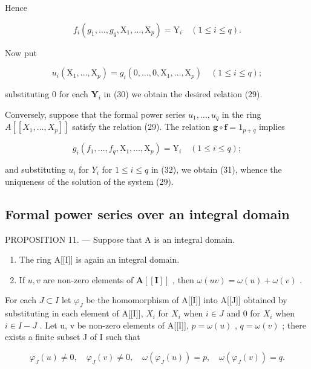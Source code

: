 Hence

\[
f _ {i} \left(g _ {1}, \dots , g _ {q}, \mathrm{X} _ {1}, \dots , \mathrm{X} _ {p}\right) = \mathrm{Y} _ {i} \quad (1 \leqslant i \leqslant q).\tag{30}
\]

Now put

\[
u _ {i} \left(\mathrm{X} _ {1}, \dots , \mathrm{X} _ {p}\right) = g _ {i} (0, \dots , 0, \mathrm{X} _ {1}, \dots , \mathrm{X} _ {p}) \quad (1 \leqslant i \leqslant q);\tag{31}
\]

substituting 0 for each \(\mathbf{Y}_i\) in (30) we obtain the desired relation (29).

Conversely, suppose that the formal power series \(u_1, \ldots, u_q\) in the ring \(A[[X_1, \ldots, X_p]]\) satisfy the relation (29). The relation \(\mathbf{g} \circ \mathbf{f} = 1_{p + q}\) implies

\[
g _ {i} (f _ {1}, \dots , f _ {q}, \mathrm{X} _ {1}, \dots , \mathrm{X} _ {p}) = \mathrm{Y} _ {i} \quad (1 \leqslant i \leqslant q);\tag{32}
\]

and substituting \(u_{i}\) for \(Y_{i}\) for \(1 \leqslant i \leqslant q\) in (32), we obtain (31), whence the uniqueness of the solution of the system (29).

\subsection{Formal power series over an integral domain}

PROPOSITION 11. --- Suppose that A is an integral domain.

\begin{enumerate}
\def\labelenumi{(\roman{enumi})}
\item
  The ring A{[}{[}I{]}{]} is again an integral domain.
\item
  If \(u, v\) are non-zero elements of \(\mathbf{A}[[\mathbf{I}]]\) , then \(\omega(uv) = \omega(u) + \omega(v)\) .
\end{enumerate}

For each \(J \subset I\) let \(\varphi_{J}\) be the homomorphism of A{[}{[}I{]}{]} into A{[}{[}J{]}{]} obtained by substituting in each element of A{[}{[}I{]}{]}, \(X_{i}\) for \(X_{i}\) when \(i \in J\) and 0 for \(X_{i}\) when \(i \in I - J\) . Let u, v be non-zero elements of A{[}{[}I{]}{]}, \(p = \omega(u)\) , \(q = \omega(v)\) ; there exists a finite subset J of I such that

\[
\varphi_ {J} (u) \neq 0, \quad \varphi_ {J} (v) \neq 0, \quad \omega (\varphi_ {J} (u)) = p, \quad \omega (\varphi_ {J} (v)) = q.
\]

